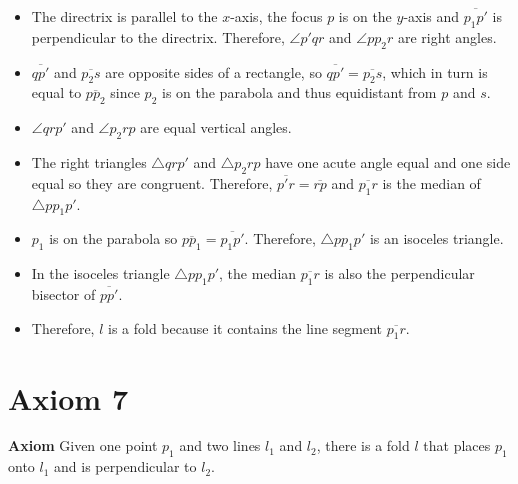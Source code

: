 \begin{itemize}
\item The directrix is parallel to the $x$-axis, the focus $p$ is on the $y$-axis and $\overline{p_1p'}$ is perpendicular to the directrix. Therefore, $\angle p'qr$ and $\angle pp_2r$ are right angles.
\item $\overline{qp'}$ and $\overline{p_2s}$ are opposite sides of a rectangle, so $\overline{qp'}=\overline{p_2s}$, which in turn is equal to $\overline{pp_2}$ since $p_2$ is on the parabola and thus equidistant from $p$ and $s$.
\item $\angle qrp'$ and $\angle p_2rp$ are equal vertical angles.
\item The right triangles $\triangle qrp'$ and $\triangle p_2rp$ have one acute angle equal and one side equal so they are congruent. Therefore, $\overline{p'r}=\overline{rp}$ and $\overline{p_1r}$ is the median of $\triangle pp_1p'$.
\item $p_1$ is on the parabola so $\overline{pp_1}=\overline{p_1p'}$. Therefore, $\triangle pp_1p'$ is an isoceles triangle.
\item In the isoceles triangle $\triangle pp_1p'$, the median $\overline{p_1r}$ is also the perpendicular bisector of $\overline{pp'}$.
\item Therefore, $l$ is a fold because it contains the line segment $\overline{p_1r}$.
\end{itemize}


\newpage

\section{Axiom 7}\label{s.ax7}

\textbf{Axiom} 
Given one point $p_1$ and two lines $l_1$ and $l_2$, there is a fold $l$ that places $p_1$ onto $l_1$ and is perpendicular to $l_2$.


